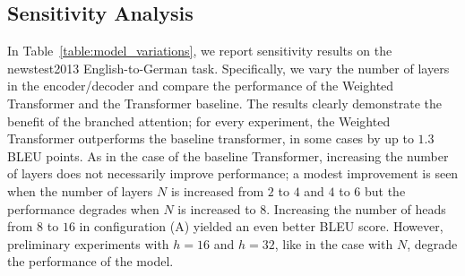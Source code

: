 \documentclass{article} %
\newcommand{\name}{Weighted Transformer\xspace}
\begin{document}
\subsection{Sensitivity Analysis}
In Table~\ref{table:model_variations}, we report sensitivity results on the newstest2013 English-to-German task. Specifically, we vary the number of layers in the encoder/decoder and compare the performance of the \name and the Transformer baseline. The results clearly demonstrate the benefit of the branched attention; for every experiment, the \name outperforms the baseline transformer, in some cases by up to $1.3$ BLEU points. As in the case of the baseline Transformer, increasing the number of layers does not necessarily improve performance; a modest improvement is seen when the number of layers $N$ is increased from $2$ to $4$ and $4$ to $6$ but the performance degrades when $N$ is increased to $8$. Increasing the number of heads from $8$ to $16$ in configuration (A) yielded an even better BLEU score. However, preliminary experiments with $h=16$ and $h=32$, like in the case with $N$, degrade the performance of the model. 




  
\end{document}
